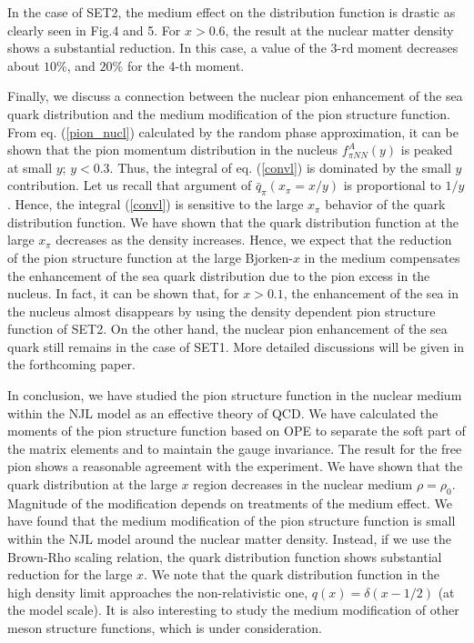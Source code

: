 In the case of SET2, the medium effect on the distribution function is
drastic as clearly seen in Fig.4 and 5.  For $x>0.6$, the result at the
nuclear matter density shows a substantial reduction.  In this case,
a value of the 3-rd moment decreases about $10 \%$, and $20 \%$
for the 4-th moment.



Finally, we discuss a connection between the nuclear pion enhancement
of the sea quark distribution  and the medium modification of the
pion structure function.
{}From eq. (\ref{pion_nucl}) calculated by the random phase
approximation, it can be shown that the pion momentum
distribution in the nucleus $f_{\pi NN}^A (y)$ is peaked at small $y$;
$y<0.3$\cite{ET,pion_excess}.
Thus, the integral of eq. (\ref{convl}) is dominated by the small $y$
contribution.  Let us recall that argument of
$\bar q_\pi (x_\pi =x/y)$ is proportional to $1/y$.
Hence, the integral (\ref{convl}) is sensitive to the large $x_\pi$
behavior of the quark distribution function\cite{NPE}.
We have shown that the quark distribution function at the large $x_\pi$
decreases as the density increases.  Hence, we expect that the reduction
of the pion structure function at the large Bjorken-$x$ in the medium
compensates the enhancement of the sea quark distribution due to
the pion excess in the nucleus.
In fact, it can be shown that, for $x>0.1$,
the enhancement of the sea in the nucleus almost
disappears by using the density dependent pion structure function
of SET2.  On the other hand, the nuclear pion
enhancement of the sea quark still remains in the case of SET1.  More
detailed discussions will be given in the forthcoming paper\cite{NPE}.



In conclusion, we have studied the pion structure function in the
nuclear
medium within the NJL model as an effective theory of QCD.  We have
calculated the moments of the pion structure function based on OPE to
separate the soft part of the matrix elements and to
maintain the gauge invariance.
The result for the free pion shows a reasonable agreement with the
experiment.
We have shown that the quark distribution at the large $x$ region
decreases in the nuclear medium $\rho = \rho_0$.
Magnitude of the modification depends on treatments of the medium
effect.  We have found that the medium modification of the
pion structure
function is small within the NJL model around the nuclear
matter density.
Instead, if we use the Brown-Rho scaling relation,
the quark distribution
function shows  substantial reduction for the large $x$.
We note that the quark distribution function in the high density limit
approaches the non-relativistic one, $q (x) = \delta (x-1/2)$ (at the
model scale).
It is also interesting to study the medium modification of other meson
structure functions, which is under consideration\cite{NPE}.

